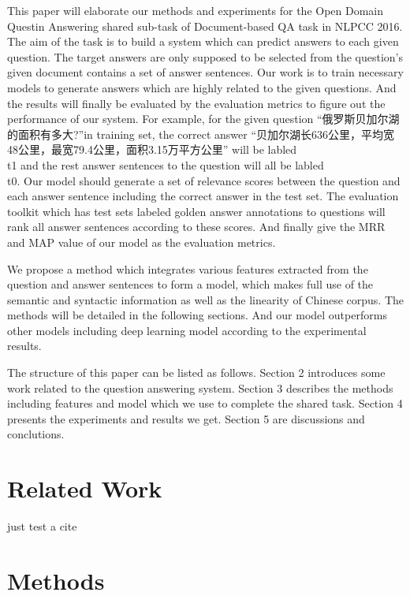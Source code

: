 \documentclass{llncs}
\begin{document}
This paper will elaborate our methods and experiments for the Open Domain Questin Answering shared sub-task of Document-based QA task in NLPCC 2016. The aim of the task is to build a system which can predict answers to each given question. The target answers are only supposed to be selected from the question's given document contains a set of answer sentences. Our work is to train necessary models to generate answers which are highly related to the given questions. And the results will finally be evaluated by the evaluation metrics to figure out the performance of our system. For example, for the given question “俄罗斯贝加尔湖的面积有多大?”in training set, the correct answer “贝加尔湖长636公里，平均宽48公里，最宽79.4公里，面积3.15万平方公里” will be labled \\t1 and the rest answer sentences to the question will all be labled \\t0. Our model should generate a set of relevance scores between the question and each answer sentence including the correct answer in the test set. The evaluation toolkit which has test sets labeled golden answer annotations to questions will rank all answer sentences according to these scores. And finally give the MRR and MAP value of our model as the evaluation metrics.

We propose a method which integrates various features extracted from the question and answer sentences to form a model, which makes full use of the semantic and syntactic information as well as the linearity of Chinese corpus. The methods will be detailed in the following sections. And our model outperforms other models including deep learning model according to the  experimental results.  

The structure of this paper can be listed as follows. Section 2 introduces some work related to the question answering system. Section 3 describes the methods including features and model which we use to complete the shared task. Section 4  presents the experiments and results we get. Section 5 are discussions and conclutions.

\section{Related Work}
just test a cite~\cite{Severyn2015Learning}

\section{Methods}
\end{document}
